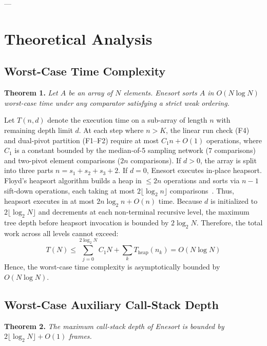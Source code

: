 \documentclass[journal]{IEEEtran}
\begin{document}
---

\section{Theoretical Analysis}

\subsection{Worst-Case Time Complexity}
\textbf{Theorem 1.} \textit{Let $A$ be an array of $N$ elements. Enesort sorts $A$ in $O(N \log N)$ worst-case time under any comparator satisfying a strict weak ordering.}

\begin{IEEEproof}
Let $T(n, d)$ denote the execution time on a sub-array of length $n$ with remaining depth limit $d$. 
At each step where $n > K$, the linear run check (F4) and dual-pivot partition (F1--F2) require at most $C_1 n + O(1)$ operations, where $C_1$ is a constant bounded by the median-of-5 sampling network ($7$ comparisons) and two-pivot element comparisons ($2n$ comparisons).
If $d > 0$, the array is split into three parts $n = s_1 + s_2 + s_3 + 2$. If $d = 0$, Enesort executes in-place heapsort. Floyd's heapsort algorithm builds a heap in $\le 2n$ operations and sorts via $n-1$ sift-down operations, each taking at most $2 \lfloor \log_2 n \rfloor$ comparisons~\cite{musser1997introspective}. Thus, heapsort executes in at most $2n \log_2 n + O(n)$ time.
Because $d$ is initialized to $2 \lfloor \log_2 N \rfloor$ and decrements at each non-terminal recursive level, the maximum tree depth before heapsort invocation is bounded by $2 \log_2 N$. Therefore, the total work across all levels cannot exceed:
\begin{equation}
    T(N) \le \sum_{j=0}^{2\log_2 N} C_1 N + \sum_{k} T_{\text{heap}}(n_k) = O(N \log N)
\end{equation}
Hence, the worst-case time complexity is asymptotically bounded by $O(N \log N)$.
\end{IEEEproof}

\subsection{Worst-Case Auxiliary Call-Stack Depth}
\textbf{Theorem 2.} \textit{The maximum call-stack depth of Enesort is bounded by $2 \lfloor \log_2 N \rfloor + O(1)$ frames.}
\end{document}

